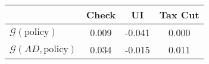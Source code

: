 \begin{tabular}{@{}lccc@{}} 
\toprule 
                          & Check      & UI    & Tax Cut    \\  \midrule 
$\mathcal{G}(\text{policy})$ & 0.009  & -0.041  & 0.000     \\ 
$\mathcal{G}(AD,\text{policy})$ & 0.034  & -0.015  & 0.011     \\ 
\end{tabular}  
